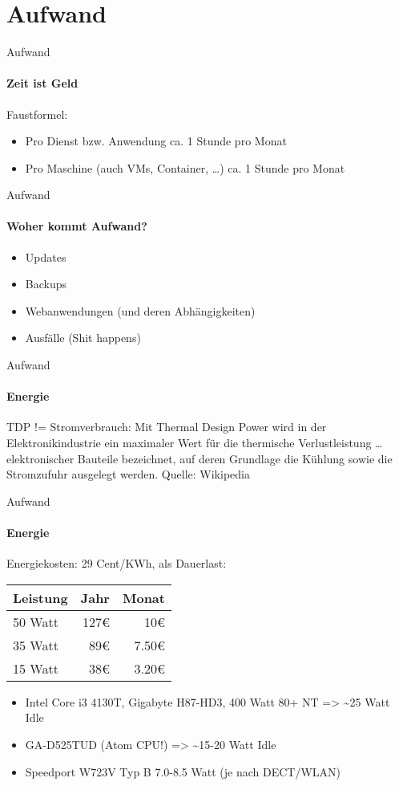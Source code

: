 \section{Aufwand}

\begin{frame}{Aufwand}
\framesubtitle{Zeit ist Geld}
Faustformel:
\begin{itemize}
\item Pro Dienst bzw. Anwendung ca. 1 Stunde pro Monat
\pause
\item Pro Maschine (auch VMs, Container, …) ca. 1 Stunde pro Monat
\end{itemize}
\end{frame}

\begin{frame}{Aufwand}
\framesubtitle{Woher kommt Aufwand?}
\begin{itemize}
\item Updates
\pause
\item Backups
\pause
\item Webanwendungen (und deren Abhängigkeiten)
\pause
\item Ausfälle (Shit happens)
\end{itemize}
\end{frame}

\begin{frame}{Aufwand}
\framesubtitle{Energie}
TDP != Stromverbrauch:
Mit Thermal Design Power wird in der Elektronikindustrie ein maximaler Wert für die thermische Verlustleistung … elektronischer Bauteile bezeichnet, auf deren Grundlage die Kühlung sowie die Stromzufuhr ausgelegt werden.
Quelle: Wikipedia
\end{frame}

\begin{frame}{Aufwand}
\framesubtitle{Energie}
Energiekosten: 29 Cent/KWh, als Dauerlast:\\
\pause
\begin{tabular}{|l|r|r|}
\hline
\textbf{Leistung} & \textbf{Jahr} & \textbf{Monat} \\
\hline
50 Watt & 127€ &  10€ \\
\hline
35 Watt & 89€ & 7.50€ \\
\hline
15 Watt & 38€ & 3.20€ \\
\hline
\end{tabular}
\pause
\begin{itemize}
\item Intel Core i3 4130T, Gigabyte H87-HD3, 400 Watt 80+ NT => \textasciitilde{}25 Watt Idle
\pause
\item GA-D525TUD (Atom CPU!) => \textasciitilde{}15-20 Watt Idle
\pause
\item Speedport W723V Typ B 7.0-8.5 Watt (je nach DECT/WLAN)
\end{itemize}
\end{frame}

